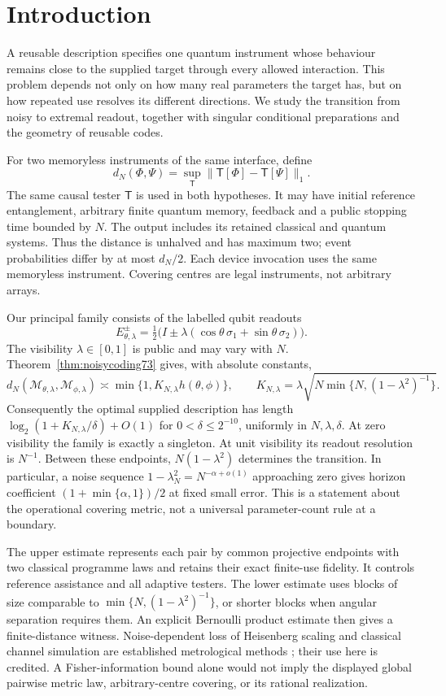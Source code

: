 \section{Introduction}
A reusable description specifies one quantum instrument whose behaviour
remains close to the supplied target through every allowed interaction.
This problem depends not only on how many real parameters the target
has, but on how repeated use resolves its different directions.
We study the transition from noisy to extremal readout, together with
singular conditional preparations and the geometry of reusable codes.

For two memoryless instruments of the same interface, define
\[
 d_N(\Phi,\Psi)=\sup_{\mathsf T}
       \|\mathsf T[\Phi]-\mathsf T[\Psi]\|_1.
\]
The same causal tester $\mathsf T$ is used in both hypotheses. It may
have initial reference entanglement, arbitrary finite quantum memory,
feedback and a public stopping time bounded by $N$. The output includes
its retained classical and quantum systems. Thus the distance is
unhalved and has maximum two; event probabilities differ by at most
$d_N/2$. Each device invocation uses the same memoryless instrument.
Covering centres are legal instruments, not arbitrary arrays.

Our principal family consists of the labelled qubit readouts
\[
 E_{\theta,\lambda}^{\pm}=\tfrac12\bigl(I\pm\lambda
              (\cos\theta\,\sigma_1+\sin\theta\,\sigma_2)\bigr).
\]
The visibility $\lambda\in[0,1]$ is public and may vary with $N$.
Theorem~\ref{thm:noisycoding73} gives, with absolute constants,
\[
 d_N(\mathcal M_{\theta,\lambda},\mathcal M_{\phi,\lambda})
 \asymp \min\{1,K_{N,\lambda}h(\theta,\phi)\},\qquad
 K_{N,\lambda}=\lambda\sqrt{N\min\{N,(1-\lambda^2)^{-1}\}}.
\]
Consequently the optimal supplied description has length
$\log_2(1+K_{N,\lambda}/\delta)+O(1)$ for
$0<\delta\le2^{-10}$, uniformly in $N,\lambda,\delta$.
At zero visibility the family is exactly a singleton. At unit
visibility its readout resolution is $N^{-1}$. Between these endpoints,
$N(1-\lambda^2)$ determines the transition. In particular, a noise
sequence $1-\lambda_N^2=N^{-\alpha+o(1)}$ approaching zero gives
horizon coefficient $(1+\min\{\alpha,1\})/2$ at fixed small error.
This is a statement about the operational covering metric, not a
universal parameter-count rule at a boundary.

The upper estimate represents each pair by common projective endpoints
with two classical programme laws and retains their exact finite-use
fidelity. It controls reference assistance and all adaptive testers.
The lower estimate uses blocks of size comparable to
$\min\{N,(1-\lambda^2)^{-1}\}$, or shorter blocks when angular
separation requires them. An explicit Bernoulli product estimate then
gives a finite-distance witness. Noise-dependent loss of Heisenberg
scaling and classical channel simulation are established metrological
methods \cite{DKG67}; their use here is credited. A Fisher-information
bound alone would not imply the displayed global pairwise metric law,
arbitrary-centre covering, or its rational realization.

